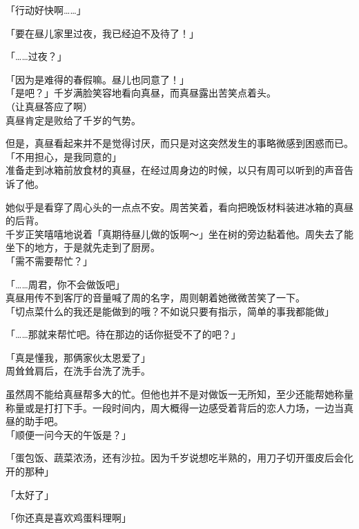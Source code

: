 「行动好快啊……」

「要在昼儿家里过夜，我已经迫不及待了！」

「……过夜？」

「因为是难得的春假嘛。昼儿也同意了！」\\

「是吧？」千岁满脸笑容地看向真昼，而真昼露出苦笑点着头。\\

（让真昼答应了啊）\\

真昼肯定是败给了千岁的气势。

但是，真昼看起来并不是觉得讨厌，而只是对这突然发生的事略微感到困惑而已。\\

「不用担心，是我同意的」\\

准备走到冰箱前放食材的真昼，在经过周身边的时候，以只有周可以听到的声音告诉了他。

她似乎是看穿了周心头的一点点不安。周苦笑着，看向把晚饭材料装进冰箱的真昼的后背。\\

千岁正笑嘻嘻地说着「真期待昼儿做的饭啊～」坐在树的旁边黏着他。周失去了能坐下的地方，于是就先走到了厨房。\\

「需不需要帮忙？」

「……周君，你不会做饭吧」\\

真昼用传不到客厅的音量喊了周的名字，周则朝着她微微苦笑了一下。\\

「切点菜什么的我还是能做到的哦？不如说只要有指示，简单的事我都能做」

「……那就来帮忙吧。待在那边的话你挺受不了的吧？」

「真是懂我，那俩家伙太恩爱了」\\

周耸耸肩后，在洗手台洗了洗手。

虽然周不能给真昼帮多大的忙。但他也并不是对做饭一无所知，至少还能帮她称量称量或是打打下手。一段时间内，周大概得一边感受着背后的恋人力场，一边当真昼的助手吧。\\

「顺便一问今天的午饭是？」

「蛋包饭、蔬菜浓汤，还有沙拉。因为千岁说想吃半熟的，用刀子切开蛋皮后会化开的那种」

「太好了」

「你还真是喜欢鸡蛋料理啊」

